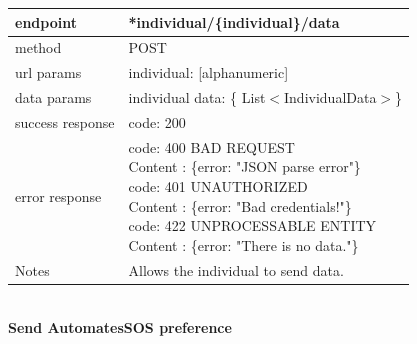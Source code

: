 \begin{legal}
\begin{legal}
\begin{itemize}
								\begin{tabularx}{\linewidth}{| l| l }
									\hline
									endpoint & *individual/\{individual\}/data \\
									\hline
									method & POST \\
									\hline
									url params & 
									\parbox{0.7\textwidth}{
										\bigskip
										individual: [alphanumeric]
										\bigskip
									} \\
									\hline
									data params &
									\parbox{0.7\textwidth}{
										\bigskip
										individual data: \{ List$<$IndividualData$>$\}
										\bigskip
									} \\
									\hline
									success response &
									\parbox{0.7\textwidth}{
										\bigskip
										code: 200
										\bigskip
									} \\
									\hline
									error response &
									\parbox{0.7\textwidth}{
										\bigskip
										code: 400 BAD REQUEST \\
										Content : \{error: "JSON parse error"\}\\
										code: 401 UNAUTHORIZED \\
										Content : \{error: "Bad credentials!"\}\\
										code: 422 UNPROCESSABLE ENTITY \\
										Content : \{error: "There is no data."\}
										\bigskip
									} \\
									\hline
									Notes & 
									\parbox{0.7\textwidth}{
										\bigskip Allows the individual to send data.
									\bigskip}  \\
									\hline
								\end{tabularx}\\
								
								\textbf{Send AutomatesSOS preference} \\
			

\end{itemize}
\end{legal}
\end{legal}
